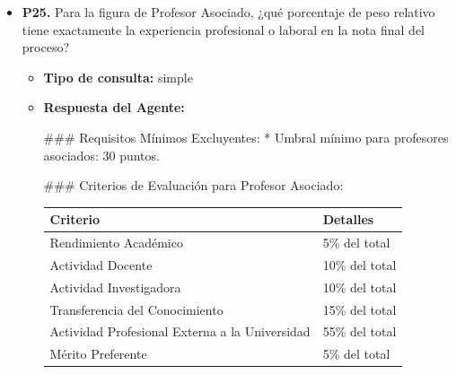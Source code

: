 \documentclass{article}
\begin{document}
\begin{itemize}
\begin{itemize}
            \end{itemize}

      \item \textbf{P25.} Para la figura de Profesor Asociado, ¿qué porcentaje de peso relativo tiene exactamente la experiencia profesional o laboral en la nota final del proceso? \\
            \begin{itemize}
                  \item \textbf{Tipo de consulta:} simple
                  \item \textbf{Respuesta del Agente:}

                        \#\#\# Requisitos Mínimos Excluyentes:
                        * Umbral mínimo para profesores asociados: 30 puntos.

                        \#\#\# Criterios de Evaluación para Profesor Asociado:

                        \vspace{0.4cm}
                        \begin{table}[h!]\centering\renewcommand{\arraystretch}{1.3}
                              \begin{tabular}{|p{}|p{}|}\hline
                                    Criterio                                       & Detalles       \\\hline
                                    Rendimiento Académico                          & 5\% del total  \\\hline
                                    Actividad Docente                              & 10\% del total \\\hline
                                    Actividad Investigadora                        & 10\% del total \\\hline
                                    Transferencia del Conocimiento                 & 15\% del total \\\hline
                                    Actividad Profesional Externa a la Universidad & 55\% del total \\\hline
                                    Mérito Preferente                              & 5\% del total  \\\hline
                              \end{tabular}\end{table}
                        \vspace{0.4cm}


\end{itemize}
\end{itemize}
\end{document}
